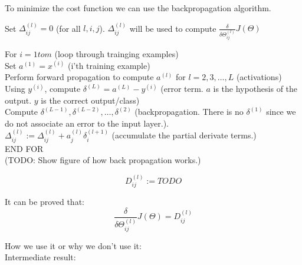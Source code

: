 To minimize the cost function we can use the backpropagation algorithm.

Set $\Delta^{(l)}_{ij} = 0$ (for all $l,i,j$).
$\Delta^{(l)}_{ij}$ will be used to compute
$\frac{\delta}{\delta\Theta^{(l)}_{ij}}J(\Theta)$

For $i=1to m$ (loop through trainging examples)\\
Set $a^{(1)}=x^{(i)}$ (i'th training example) \\
Perform forward propagation to compute $a^{(l)}$ for $l=2,3,\dots,L$ (activations) \\
Using $y^{(i)}$, compute $\delta^{(L)} =a^{(L)}-y^{(i)}$ (error term. $a$ is the hypothesis of the output. $y$ is the correct output/class)\\
Compute $\delta^{(L-1)},\delta^{(L-2)},\dots,\delta^{(2)}$ (backpropagation. There is no $\delta^{(1)}$ since we do not associate an error to the input layer.). \\

$\Delta^{(l)}_{ij}:=\Delta^{(l)}_{ij}+a^{(l)}_j\delta^{(l+1)}_i$ (accumulate the partial derivate terms.)  \\

END FOR \\

(TODO: Show figure of how back propagation works.)

\begin{equation}
D^{(l)}_{ij} := TODO
\end{equation}

It can be proved that:
\begin{equation}
\frac{\delta}{\delta\Theta^{(l)}_{ij}}J(\Theta) =D^{(l)}_{ij}
\end{equation}

How we use it or why we don't use it:\\

Intermediate result:\\

